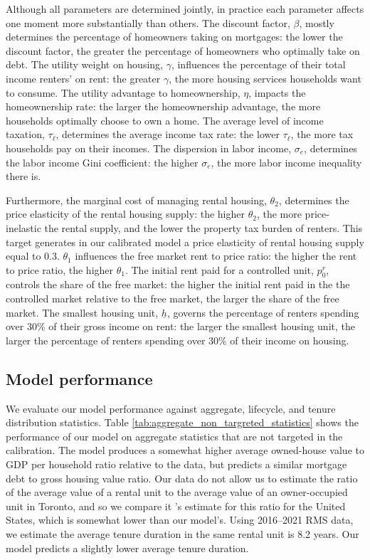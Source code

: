 \documentclass[parskip=full]{article}
\begin{document}
Although all parameters are determined jointly, in practice each parameter affects one moment more substantially than others. The discount factor, $\beta$, mostly determines the percentage of homeowners taking on mortgages: the lower the discount factor, the greater the percentage of homeowners who optimally take on debt. The utility weight on housing, $\gamma$, influences the percentage of their total income renters' on rent: the greater $\gamma$, the more housing services households want to consume. The utility advantage to homeownership, $\eta$, impacts the homeownership rate: the larger the homeownership advantage, the more households optimally choose to own a home. The average level of income taxation, $\tau_{\ell}$, determines the average income tax rate: the lower $\tau_{\ell}$, the more tax households pay on their incomes. The dispersion in labor income, $\sigma_{e}$, determines the labor income Gini coefficient: the higher $\sigma_{e}$, the more labor income inequality there is. 

Furthermore, the marginal cost of managing rental housing, $\theta_{2}$, determines the price elasticity of the rental housing supply: the higher $\theta_{2}$, the more price-inelastic the rental supply, and the lower the property tax burden of renters. This target generates in our calibrated model a price elasticity of rental housing supply equal to 0.3. $\theta_{1}$ influences the free market rent to price ratio: the higher the rent to price ratio, the higher $\theta_{1}$. The initial rent paid for a controlled unit, $p^{r}_{0}$, controls the share of the free market: the higher the initial rent paid in the the controlled market relative to the free market, the larger the share of the free market. The smallest housing unit, $\underline{h}$, governs the percentage of renters spending over 30\% of their gross income on rent: the larger the smallest housing unit, the larger the percentage of renters spending over 30\% of their income on housing. 

\subsection{Model performance}\label{subsection:non_targeted_statistics}

We evaluate our model performance against aggregate, lifecycle, and tenure distribution statistics. Table \ref{tab:aggregate_non_targreted_statistics} shows the performance of our model on aggregate statistics that are not targeted in the calibration. The model produces a somewhat higher average owned-house value to GDP per household ratio relative to the data, but predicts a similar mortgage debt to gross housing value ratio. Our data do not allow us to estimate the ratio of the average value of a rental unit to the average value of an owner-occupied unit in Toronto, and so we compare it \citet{chatterjee-eyigungor-2015}'s estimate for this ratio for the United States, which is somewhat lower than our model's. Using 2016--2021 RMS data, we estimate the average tenure duration in the same rental unit is 8.2 years. Our model predicts a slightly lower average tenure duration. 
\end{document}
